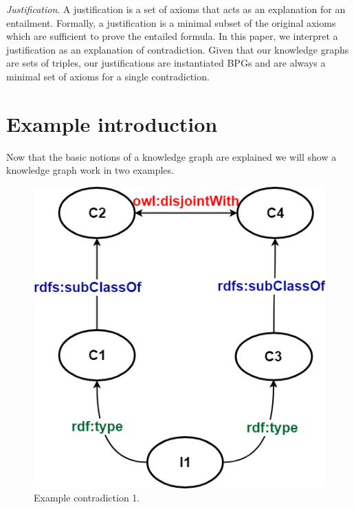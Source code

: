 \documentclass[11pt,letterpaper ,oneside ]{book}
\begin{document}
	\textit{Justification}. A justification\cite{Horridge:2009} is a set of axioms that acts as an explanation for an entailment.
	Formally, a justification is a minimal subset of the original axioms which are sufficient to prove the entailed formula. In this paper, we interpret a justification as an explanation of contradiction. Given that our knowledge graphs are sets of triples, our justifications are instantiated BPGs and are always a minimal set of axioms for a single contradiction. \\
	
	
	\section{Example introduction}
	Now that the basic notions of a knowledge graph are explained we will show a knowledge graph work in two examples. 
	\begin{figure}
		\centering
		\includegraphics[width=\linewidth]{images/Example1.png}
		\caption{Example contradiction 1.}
		\label{fig:Example1}
	\end{figure}
\end{document}
